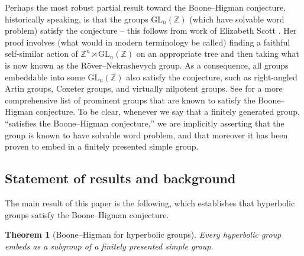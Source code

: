 \documentclass[11pt,letterpaper]{amsart}
\newtheorem{theorem}{Theorem}[section]
\theoremstyle{definition}
\newcommand{\Z}{\mathbb{Z}}
\newcommand{\GL}{\mathrm{GL}}
\begin{document}
Perhaps the most robust partial result toward the Boone--Higman conjecture, historically speaking, is that the groups $\GL_n(\Z)$ (which have solvable word problem) satisfy the conjecture -- this follows from work of Elizabeth Scott \cite{scott84}. Her proof involves (what would in modern terminology be called) finding a faithful self-similar action of $\Z^n\rtimes \GL_n(\Z)$ on an appropriate tree and then taking what is now known as the R\"over--Nekrashevych group. As a consequence, all groups embeddable into some $\GL_n(\Z)$ also satisfy the conjecture, such as right-angled Artin groups, Coxeter groups, and virtually nilpotent groups. See \cite{bbmz_survey} for a more comprehensive list of prominent groups that are known to satisfy the Boone--Higman conjecture. To be clear, whenever we say that a finitely generated group, ``satisfies the Boone--Higman conjecture,'' we are implicitly asserting that the group is known to have solvable word problem, and that moreover it has been proven to embed in a finitely presented simple group.


\subsection{Statement of results and background}\label{ssec:statement}

The main result of this paper is the following, which establishes that hyperbolic groups satisfy the Boone--Higman conjecture.

{\renewcommand*{\thetheorem}{\Alph{theorem}}
\begin{theorem}[Boone--Higman for hyperbolic groups]\label{thrm:bh_hyp}
Every hyperbolic group embeds as a subgroup of a finitely presented simple group.
\end{theorem}}
\end{document}

